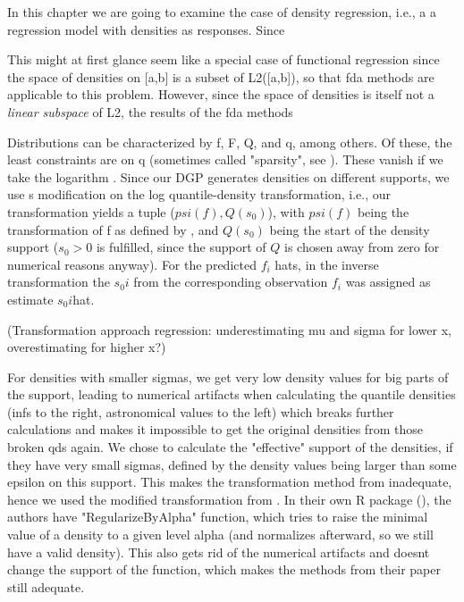 In this chapter we are going to examine the case of density regression, i.e., a
a regression model with densities as responses. Since 

This might at first glance seem like a
special case of functional regression since the space of densities on [a,b] is a subset
of L2([a,b]), so that fda methods are applicable to this problem. However, since the
space of densities is itself not a \textit{linear subspace} of L2, the results of the
fda methods 

Distributions can be characterized by f, F, Q, and q, among others. Of these, the least
constraints are on q (sometimes called "sparsity", see \textcite{Tukey1965}). These vanish if we
take the logarithm \parencite[cf.][]{KokoszkaEtAl2019}. Since our DGP generates densities on
different supports, we use \textcite{KokoszkaEtAl2019}s modification on the log quantile-density
transformation, i.e., our transformation yields a tuple ($psi(f), Q(s_0)$), with
$psi(f)$ being the transformation of f as defined by \textcite{PetersenMüller2016}, and
$Q(s_0)$ being the start of the density support ($s_0 > 0$ is fulfilled, since the support
of $Q$ is chosen away from zero for numerical reasons anyway). For the predicted $f_i$ hats,
in the inverse transformation the $s_0i$ from the corresponding observation $f_i$ was
assigned as estimate $s_0i$hat.

(Transformation approach regression: underestimating mu and sigma for lower x,
overestimating for higher x?) \textcite{PetersenLiuDivani2021}

For densities with smaller sigmas, we get very low density values for big parts of the
support, leading to numerical artifacts when calculating the quantile densities (infs
to the right, astronomical values to the left) which breaks further calculations and
makes it impossible to get the original densities from those broken qds again. We chose
to calculate the "effective" support of the densities, if they have very small sigmas,
defined by the density values being larger than some epsilon on this support. This
makes the transformation method from \textcite{PetersenMüller2016} inadequate, hence we
used the modified transformation from \textcite{KokoszkaEtAl2019}. In their own R
package (), the authors have "RegularizeByAlpha" function, which tries to raise the minimal
value of a density to a given level alpha (and normalizes afterward, so we still have a
valid density). This also gets rid of the numerical artifacts and doesnt change the
support of the function, which makes the methods from their paper still adequate.


